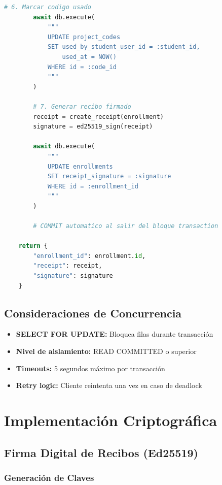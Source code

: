 \documentclass[12pt,a4paper]{article}
\begin{document}
\begin{lstlisting}[language=Python]
        # 6. Marcar codigo usado
        await db.execute(
            """
            UPDATE project_codes
            SET used_by_student_user_id = :student_id,
                used_at = NOW()
            WHERE id = :code_id
            """
        )
        
        # 7. Generar recibo firmado
        receipt = create_receipt(enrollment)
        signature = ed25519_sign(receipt)
        
        await db.execute(
            """
            UPDATE enrollments
            SET receipt_signature = :signature
            WHERE id = :enrollment_id
            """
        )
        
        # COMMIT automatico al salir del bloque transaction
    
    return {
        "enrollment_id": enrollment.id,
        "receipt": receipt,
        "signature": signature
    }
\end{lstlisting}

\subsection{Consideraciones de Concurrencia}

\begin{itemize}[leftmargin=*]
    \item \textbf{SELECT FOR UPDATE:} Bloquea filas durante transacción
    \item \textbf{Nivel de aislamiento:} READ COMMITTED o superior
    \item \textbf{Timeouts:} 5 segundos máximo por transacción
    \item \textbf{Retry logic:} Cliente reintenta una vez en caso de deadlock
\end{itemize}

\section{Implementación Criptográfica}

\subsection{Firma Digital de Recibos (Ed25519)}

\subsubsection{Generación de Claves}
\end{document}

